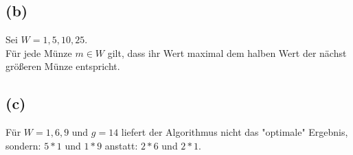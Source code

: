 \subsection*{(b)}

Sei $W = {1,5,10,25}$.\\
Für jede Münze $m \in W$ gilt, dass ihr Wert maximal dem halben Wert der nächst größeren Münze entspricht.\\ 


\subsection*{(c)}

Für $W = {1,6,9}$ und $g = 14$ liefert der Algorithmus nicht das "optimale" Ergebnis, sondern: $5 * 1$ und $1 * 9$ anstatt: $2 * 6$ und $2 * 1$.


